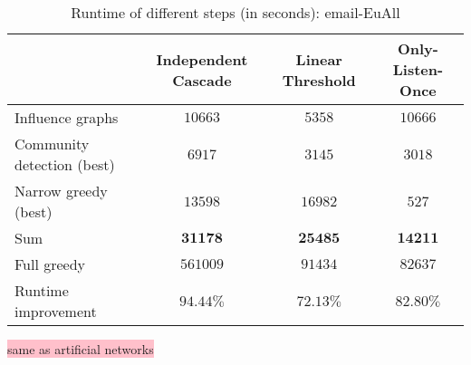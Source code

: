 \documentclass[pdflatex,sn-mathphys-num]{sn-jnl}
\begin{document}
\begin{table}[ht]
\vspace{7.5mm}

\caption{Runtime of different steps (in seconds): email-EuAll}
\label{table_runtimes_big_emaileuall}
\begin{tabular}{@{}lccc@{}}
\toprule
& Independent Cascade & Linear Threshold & Only-Listen-Once \\
\midrule
Influence graphs & $10663$ & $5358$ & $10666$ \\
Community detection (best)\footnotemark[4] & $6917$ & $3145$ & $3018$ \\
Narrow greedy (best)\footnotemark[4] & $13598$ & $16982$ & $527$ \\
\midrule
Sum & $\mathbf{31178}$ & $\mathbf{25485}$ & $\mathbf{14211}$ \\
Full greedy & $561009$ & $91434$ & $82637$ \\
\midrule
Runtime improvement & $94.44\%$ & $72.13\%$ & $82.80\%$ \\
\midrule
\end{tabular}

\end{table}

\colorbox{pink}{same as artificial networks}
\end{document}
